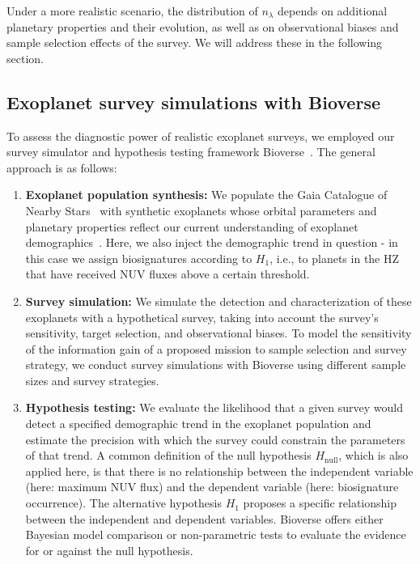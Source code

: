 \documentclass[twocolumn,twocolappendix,linenumbers]{aastex631}
\begin{document}
Under a more realistic scenario, the distribution of $n_{\lambda}$ depends on additional planetary properties and their evolution, as well as on observational biases and sample selection effects of the survey.
We will address these in the following section.


\subsection{Exoplanet survey simulations with Bioverse}
To assess the diagnostic power of realistic exoplanet surveys, we employed our survey simulator and hypothesis testing framework Bioverse~\citep{Bixel2021}.
The general approach is as follows:
\begin{enumerate}
\item \textbf{Exoplanet population synthesis:} We populate the Gaia Catalogue of Nearby Stars~\citep{Smart2021} with synthetic exoplanets whose orbital parameters and planetary properties reflect our current understanding of exoplanet demographics~\citep{Bergsten2022,Hardegree-Ullman2023}.
Here, we also inject the demographic trend in question - in this case we assign biosignatures according to $H_1$, i.e., to planets in the \gls{HZ} that have received \gls{NUV} fluxes above a certain threshold.
    \item \textbf{Survey simulation:} We simulate the detection and characterization of these exoplanets with a hypothetical survey, taking into account the survey's sensitivity, target selection, and observational biases.
To model the sensitivity of the information gain of a proposed mission to sample selection and survey strategy, we conduct survey simulations with Bioverse using different sample sizes and survey strategies.
    \item \textbf{Hypothesis testing:} We evaluate the likelihood that a given survey would detect a specified demographic trend in the exoplanet population and estimate the precision with which the survey could constrain the parameters of that trend.
    A common definition of the null hypothesis $H_\mathrm{null}$, which is also applied here, is that there is no relationship between the independent variable (here: maximum NUV flux) and the dependent variable (here: biosignature occurrence).
    The alternative hypothesis $H_1$ proposes a specific relationship between the independent and dependent variables.
    Bioverse offers either Bayesian model comparison or non-parametric tests to evaluate the evidence for or against the null hypothesis.
\end{enumerate}
\end{document}
